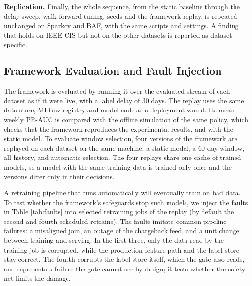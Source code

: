 \textbf{Replication.} Finally, the whole sequence, from the static baseline through the delay sweep, walk-forward tuning, seeds and the framework replay, is repeated unchanged on Sparkov and BAF, with the same scripts and settings. A finding that holds on IEEE-CIS but not on the other datasets is reported as dataset-specific.

\subsection{Framework Evaluation and Fault Injection}\label{sec:faults}

The framework is evaluated by running it over the evaluated stream of each dataset as if it were live, with a label delay of 30 days. The replay uses the same data store, MLflow registry and model code as a deployment would. Its mean weekly PR-AUC is compared with the offline simulation of the same policy, which checks that the framework reproduces the experimental results, and with the static model. To evaluate window selection, four versions of the framework are replayed on each dataset on the same machine: a static model, a 60-day window, all history, and automatic selection. The four replays share one cache of trained models, so a model with the same training data is trained only once and the versions differ only in their decisions.

A retraining pipeline that runs automatically will eventually train on bad data. To test whether the framework's safeguards stop such models, we inject the faults in Table \ref{tab:faults} into selected retraining jobs of the replay (by default the second and fourth scheduled retrains). The faults imitate common pipeline failures: a misaligned join, an outage of the chargeback feed, and a unit change between training and serving. In the first three, only the data read by the training job is corrupted, while the production feature path and the label store stay correct. The fourth corrupts the label store itself, which the gate also reads, and represents a failure the gate cannot see by design; it tests whether the safety net limits the damage.

